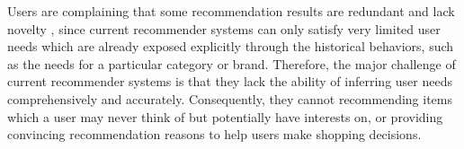 Users are complaining that some recommendation results are redundant and 
lack novelty \cite{murakami2007metrics}, 
since current recommender systems can only satisfy very limited user needs 
which are already exposed explicitly through the historical behaviors, 
such as the needs for a particular category or brand.
Therefore, the major challenge of current recommender systems is that they
lack the ability of inferring user needs comprehensively and accurately.
Consequently, they cannot recommending items which a user may never think of 
but potentially have interests on, or providing convincing recommendation reasons to help users make shopping decisions. 

